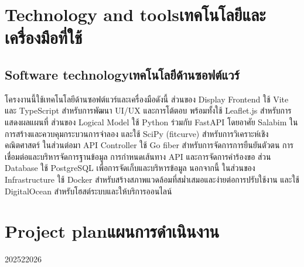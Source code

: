\section{\ifenglish Technology and tools\else เทคโนโลยีและเครื่องมือที่ใช้\fi}

\subsection{\ifenglish Software technology\else เทคโนโลยีด้านซอฟต์แวร์\fi}
    \begin{mypara}
        \indent โครงงานนี้ใช้เทคโนโลยีด้านซอฟต์แวร์และเครื่องมือดังนี้ ส่วนของ Display Frontend ใช้ Vite และ TypeScript 
        สำหรับการพัฒนา UI/UX และการโต้ตอบ พร้อมทั้งใช้ Leaflet.js สำหรับการแสดงผลแผนที่ ส่วนของ Logical Model 
        ใช้ Python ร่วมกับ FastAPI โดยอาศัย Salabim ในการสร้างและควบคุมกระบวนการจำลอง และใช้ SciPy (fitcurve) 
        สำหรับการวิเคราะห์เชิงคณิตศาสตร์ ในส่วนต่อมา API Controller ใช้ Go fiber สำหรับการจัดการการยืนยันตัวตน 
        การเชื่อมต่อและบริหารจัดการฐานข้อมูล การกำหนดเส้นทาง API และการจัดการคำร้องขอ 
        ส่วน Database ใช้ PostgreSQL เพื่อการจัดเก็บและบริหารข้อมูล นอกจากนี้ ในส่วนของ 
        Infrastructure ใช้ Docker สำหรับสร้างสภาพแวดล้อมที่สม่ำเสมอและง่ายต่อการปรับใช้งาน และใช้ DigitalOcean 
        สำหรับโฮสต์ระบบและให้บริการออนไลน์
    \end{mypara}


\section{\ifenglish Project plan\else แผนการดำเนินงาน\fi}

\begin{plan}{6}{2025}{2}{2026}
\end{plan}

